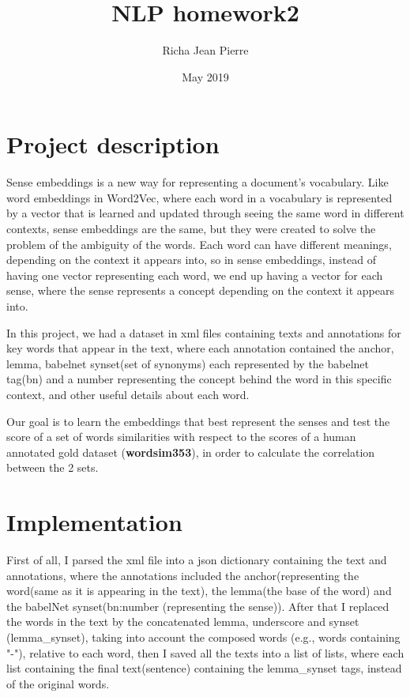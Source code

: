 \documentclass[paper=a4, fontsize=10pt, oneside]{scrartcl}
\title{NLP homework2}
\author{Richa Jean Pierre }
\date{May 2019}
\begin{document}
\maketitle

\begin{adjustwidth}{-60pt}{-60pt}
\section{Project description}

Sense embeddings is a new way for representing a document's vocabulary.
Like word embeddings in Word2Vec, where each word in a vocabulary is represented by a vector that is learned and updated through seeing the same word in different contexts, sense embeddings are the same, but they were created to solve the problem of the ambiguity of the words. Each word can have different meanings, depending on the context it appears into, so in sense embeddings, instead of having one vector representing each word, we end up having a vector for each sense, where the sense represents a concept depending on the context it appears into.

In this project, we had a dataset in xml files containing texts and annotations for key words that appear in the text, where each annotation contained the anchor, lemma, babelnet synset(set of synonyms) each represented by the babelnet tag(bn) and a number representing the concept behind the word in this specific context, and other useful details about each word.

Our goal is to learn the embeddings that best represent the senses and test the score of a set of words similarities with respect to the scores of a human annotated gold dataset (\textbf{wordsim353}), in order to calculate the correlation between the 2 sets.

\section{Implementation}

First of all, I parsed the xml file into a json dictionary containing the text and annotations, where the annotations included the anchor(representing the word(same as it is appearing in the text), the lemma(the base of the word) and the babelNet synset(bn:number (representing the sense)). After that I replaced the words in the text by the concatenated lemma, underscore and synset (lemma\_synset), taking into account the composed words (e.g., words containing "-"), relative to each word, then I saved all the texts into a list of lists, where each list containing the final text(sentence) containing the lemma\_synset tags, instead of the original words.


\end{adjustwidth}
\end{document}
